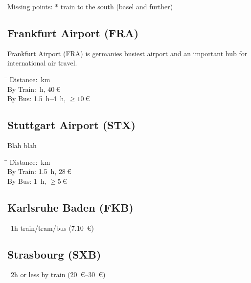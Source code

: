 \documentclass[parskip=half,final,oneside,a4paper]{scrartcl}
\begin{document}
Missing points:
 * train to the south (basel and further)

\begin{multicols}{2}

\subsection{Frankfurt Airport (FRA)}

Frankfurt Airport (FRA) is germanies busiest airport and an important hub for
international air travel.
\begin{tabbing}
\hspace*{2.5cm} \= \kill
Distance: \,km \\
By Train: \,h, $\SI{40}{\euro}$ \\
By Bus:   \> \SI{1.5}{h}–\SI{4}{h}, $\ge\SI{10}{\euro}$
\end{tabbing}

\subsection{Stuttgart Airport (STX)}

Blah blah

\begin{tabbing}
\hspace*{2.5cm} \= \kill
Distance: \,km \\
By Train: \> \SI{1.5}{\hour}, $\SI{28}{\euro}$ \\
By Bus:   \> \SI{1}{\hour}, $\ge\SI{5}{\euro}$
\end{tabbing}

\subsection{Karlsruhe Baden (FKB)}
 ~1h train/tram/bus (\SI{7.10}{\euro})

\subsection{Strasbourg (SXB)}
~2h or less by train (\SIrange{20}{30}{\euro})


\end{multicols}

\subsection{}


\newpage

\end{document}
